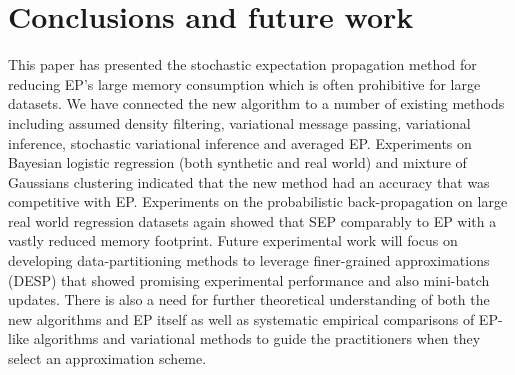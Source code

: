 \section{Conclusions and future work}
This paper has presented the stochastic expectation propagation method for reducing EP's large memory consumption which is often prohibitive for large datasets. We have connected the new algorithm to a number of existing methods including assumed density filtering, variational message passing, variational inference, stochastic variational inference and averaged EP.
%
Experiments on Bayesian logistic regression (both synthetic and real world) and mixture of Gaussians clustering indicated that the new method had an accuracy that was competitive with EP.  Experiments on the probabilistic back-propagation on large real world regression datasets again showed that SEP comparably to EP with a vastly reduced memory footprint. 
%
Future experimental work will focus on developing data-partitioning methods to leverage finer-grained approximations (DESP) that showed promising experimental performance and also mini-batch updates. There is also a need for further theoretical understanding of both the new algorithms and EP itself as well as systematic empirical comparisons of EP-like algorithms and variational methods to guide the practitioners when they select an approximation scheme.
